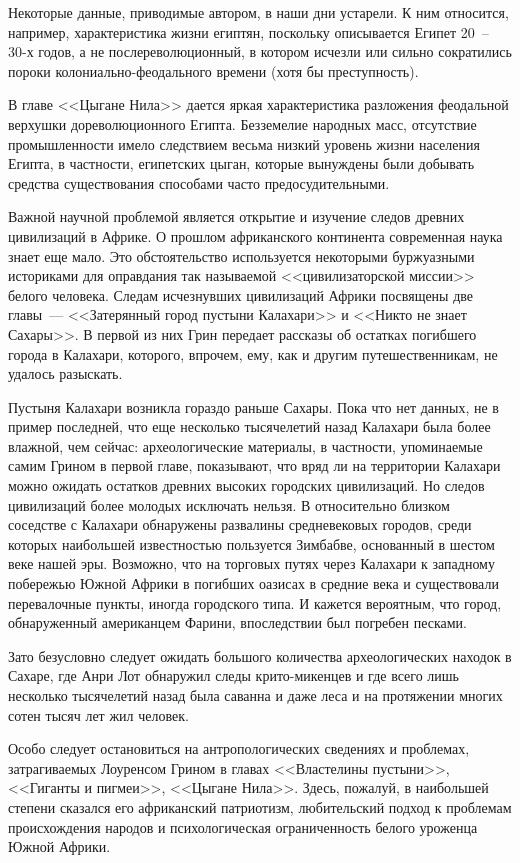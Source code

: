 \documentclass[12pt,a4paper,twoside,openany,svgnames]{memoir}
\begin{document}
Некоторые данные, приводимые автором, в наши дни устарели. К ним относится, например, характеристика жизни египтян, поскольку описывается Египет 20~-- 30-х годов, а не послереволюционный, в котором исчезли или сильно сократились пороки колониально-феодального времени (хотя бы преступность).

В главе <<Цыгане Нила>> дается яркая характеристика разложения феодальной верхушки дореволюционного Египта. Безземелие народных масс, отсутствие промышленности имело следствием весьма низкий уровень жизни населения Египта, в частности, египетских цыган, которые вынуждены были добывать средства существования способами часто предосудительными.

Важной научной проблемой является открытие и изучение следов древних цивилизаций в Африке. О прошлом африканского континента современная наука знает еще мало. Это обстоятельство используется некоторыми буржуазными историками для оправдания так называемой <<цивилизаторской миссии>> белого человека. Следам исчезнувших цивилизаций Африки посвящены две главы~--- <<Затерянный город пустыни Калахари>> и <<Никто не знает Сахары>>. В первой из них Грин передает рассказы об остатках погибшего города в Калахари, которого, впрочем, ему, как и другим путешественникам, не удалось разыскать.

Пустыня Калахари возникла гораздо раньше Сахары. Пока что нет данных, не в пример последней, что еще несколько тысячелетий назад Калахари была более влажной, чем сейчас: археологические материалы, в частности, упоминаемые самим Грином в первой главе, показывают, что вряд ли на территории Калахари можно ожидать остатков древних высоких городских цивилизаций. Но следов цивилизаций более молодых исключать нельзя. В относительно близком соседстве с Калахари обнаружены развалины средневековых городов, среди которых наибольшей известностью пользуется Зимбабве, основанный в шестом веке нашей эры. Возможно, что на торговых путях через Калахари к западному побережью Южной Африки в погибших оазисах в средние века и существовали перевалочные пункты, иногда городского типа. И кажется вероятным, что город, обнаруженный американцем Фарини, впоследствии был погребен песками.

Зато безусловно следует ожидать большого количества археологических находок в Сахаре, где Анри Лот обнаружил следы крито-микенцев и где всего лишь несколько тысячелетий назад была саванна и даже леса и на протяжении многих сотен тысяч лет жил человек.

Особо следует остановиться на антропологических сведениях и проблемах, затрагиваемых Лоуренсом Грином в главах <<Властелины пустыни>>, <<Гиганты и пигмеи>>, <<Цыгане Нила>>. Здесь, пожалуй, в наибольшей степени сказался его африканский патриотизм, любительский подход к проблемам происхождения народов и психологическая ограниченность белого уроженца Южной Африки.
\end{document}
